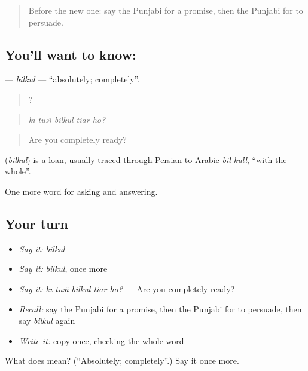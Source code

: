 \begin{quote}
Before the new one: say the Punjabi for a promise, then the Punjabi for to persuade.
\end{quote}

\subsection*{You'll want to know: }
\textbf{} — \emph{bilkul} — \textquotedblleft{}absolutely; completely\textquotedblright{}.

\begin{quote}
    ?
\end{quote}

\begin{quote}
\emph{kī tusī̃ bilkul tiār ho?}
\end{quote}

\begin{quote}
Are you completely ready?
\end{quote}

\begin{cousinweb}
\textbf{} (\emph{bilkul}) is a loan, usually traced through Persian to Arabic \emph{bil-kull}, \textquotedblleft{}with the whole\textquotedblright{}.
\end{cousinweb}

\begin{grammarlens}[title={What you've built}]
One more word for asking and answering.
\end{grammarlens}

\subsection*{Your turn}
\begin{itemize}
\raggedright
  \item \emph{Say it:} \emph{bilkul}
  \item \emph{Say it:} \emph{bilkul}, once more
  \item \emph{Say it:} \emph{kī tusī̃ bilkul tiār ho?} — Are you completely ready?
  \item \emph{Recall:} say the Punjabi for a promise, then the Punjabi for to persuade, then say \emph{bilkul} again
  \item \emph{Write it:} copy \textbf{} once, checking the whole word
\end{itemize}

\begin{tcolorbox}[breakable,colback=teal!4,colframe=teal!35!black,title={Before you move on}]
What does  mean? (\textquotedblleft{}Absolutely; completely\textquotedblright{}.) Say it once more.
\end{tcolorbox}
